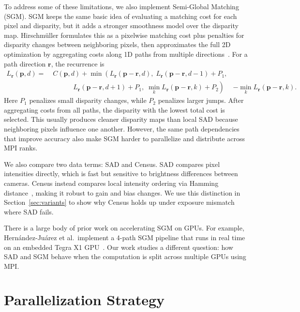 \documentclass[11pt]{article}
\begin{document}
To address some of these limitations, we also implement Semi-Global Matching
(SGM). SGM keeps the same basic idea of evaluating a matching cost for each
pixel and disparity, but it adds a stronger smoothness model over the disparity
map. Hirschm\"uller formulates this as a pixelwise matching cost plus penalties
for disparity changes between neighboring pixels, then approximates the full 2D
optimization by aggregating costs along 1D paths from multiple
directions~\cite{hirschmuller2008}. For a path direction $\mathbf{r}$, the
recurrence is
\begin{equation}
\label{eq:sgm}
\begin{aligned}
L_\mathbf{r}(\mathbf{p},d) =\;& C(\mathbf{p},d)
+ \min\!\left(
  L_\mathbf{r}(\mathbf{p}-\mathbf{r},d),\;
  L_\mathbf{r}(\mathbf{p}-\mathbf{r},d-1)+P_1,\right.\\
&\left.\qquad\quad
  L_\mathbf{r}(\mathbf{p}-\mathbf{r},d+1)+P_1,\;
  \min_k L_\mathbf{r}(\mathbf{p}-\mathbf{r},k)+P_2
\right)
&- \min_k L_\mathbf{r}(\mathbf{p}-\mathbf{r},k).
\end{aligned}
\end{equation}
Here $P_1$ penalizes small disparity changes, while $P_2$ penalizes larger jumps.
After aggregating costs from all paths, the disparity with the lowest total cost
is selected. This usually produces cleaner disparity maps than local SAD because
neighboring pixels influence one another. However, the same path dependencies
that improve accuracy also make SGM harder to parallelize and distribute across
MPI ranks.

We also compare two data terms: SAD and Census. SAD compares pixel intensities
directly, which is fast but sensitive to brightness differences between cameras.
Census instead compares local intensity ordering via Hamming
distance~\cite{zabih1994}, making it robust to gain and bias changes. We use
this distinction in Section~\ref{sec:variants} to show why Census holds up under
exposure mismatch where SAD fails.

There is a large body of prior work on accelerating SGM on GPUs. For example,
Hern\'andez-Ju\'arez et al.\ implement a 4-path SGM pipeline that runs in real
time on an embedded Tegra X1 GPU~\cite{hernandez2016}. Our work studies a
different question: how SAD and SGM behave when the computation is split across
multiple GPUs using MPI.


\section{Parallelization Strategy}
\label{sec:parallelization}
\end{document}
